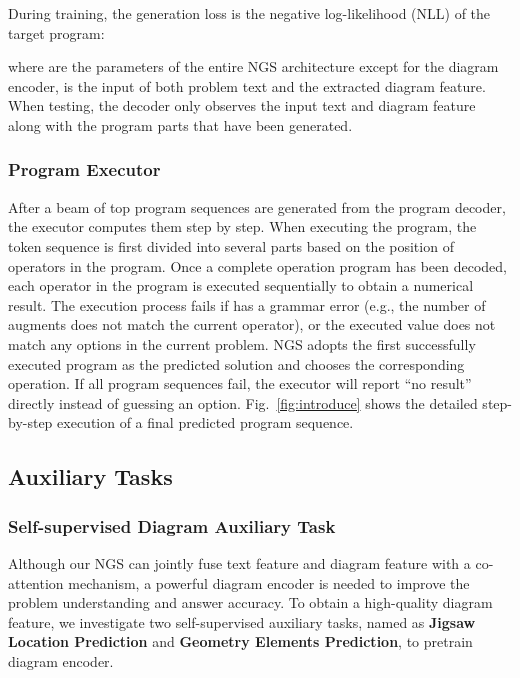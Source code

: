 \documentclass[11pt,a4paper]{article}
\begin{document}
During training, the generation loss  is the negative log-likelihood (NLL) of the target program:
{
\setlength\abovedisplayskip{0.45pt}
\setlength\belowdisplayskip{0.55pt}

}where  are the parameters of the entire NGS architecture except for the diagram encoder,  is the input of both problem text and the extracted diagram feature. When testing, the decoder only observes the input text and diagram feature along with the program parts that have been generated.

\subsubsection{Program Executor}

After a beam of top  program sequences  are generated from the program decoder, the executor computes them step by step. When executing the program, the token sequence is first divided into several parts based on the position of operators in the program. Once a complete operation program has been decoded, each operator in the program is executed sequentially to obtain a numerical result. The execution process fails if  has a grammar error (e.g., the number of augments does not match the current operator), or the executed value does not match any options in the current problem. NGS adopts the first successfully executed program as the predicted solution and chooses the corresponding operation. If all  program sequences fail, the executor will report ``no result'' directly instead of guessing an option. Fig.~\ref{fig:introduce} shows the detailed step-by-step execution of a final predicted program sequence.

















\subsection{Auxiliary Tasks}
\subsubsection{Self-supervised Diagram Auxiliary Task}


Although our NGS can jointly fuse text feature and diagram feature with a co-attention mechanism, a powerful diagram encoder is needed to improve the problem understanding and answer accuracy. To obtain a high-quality diagram feature, we investigate two self-supervised auxiliary tasks, named as \textbf{Jigsaw Location Prediction} and \textbf{Geometry Elements Prediction}, to pretrain diagram encoder. 
\end{document}
